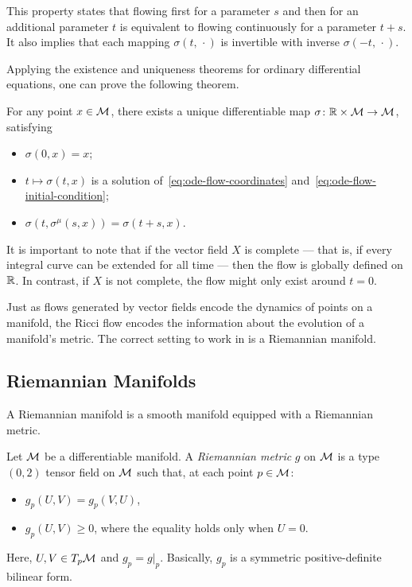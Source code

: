 This property states that flowing first for a parameter $s$ and then for an additional parameter $t$ is equivalent to flowing continuously for a parameter $t + s$. It also implies that each mapping $\sigma(t,\,\cdot)$ is invertible with inverse $\sigma(-t,\,\cdot)$.

Applying the existence and uniqueness theorems for ordinary differential equations, one can prove the following theorem.

\begin{theorem}
	For any point $x \in \mathcal{M}$, there exists a unique differentiable map $\sigma \colon \mathbb{R} \times \mathcal{M} \to \mathcal{M}$, satisfying
	\begin{itemize}
		\item $\sigma(0,x) = x$;
		\item $t \mapsto \sigma(t,x)$ is a solution of~\eqref{eq:ode-flow-coordinates} and~\eqref{eq:ode-flow-initial-condition};
		\item $\sigma(t,\sigma^\mu(s,x)) = \sigma(t+s,x)$.
	\end{itemize}
\end{theorem}

It is important to note that if the vector field $X$ is complete — that is, if every integral curve can be extended for all time — then the flow is globally defined on $\mathbb{R}$. In contrast, if $X$ is not complete, the flow might only exist around $t = 0$.

Just as flows generated by vector fields encode the dynamics of points on a manifold, the Ricci flow encodes the information about the evolution of a manifold's metric. The correct setting to work in is a Riemannian manifold. 


\subsection{Riemannian Manifolds}
A Riemannian manifold is a smooth manifold equipped with a Riemannian metric.

\begin{definition}
	Let $\mathcal{M}$ be a differentiable manifold. A \emph{Riemannian metric} $g$ on $\mathcal{M}$ is a type $(0,2)$ tensor field on $\mathcal{M}$ such that, at each point $p \in \mathcal{M}$:
	\begin{itemize}
		\item $g_p (U,V) = g_p (V,U)$,
		\item $g_p(U,V) \geq 0$, where the equality holds only when $U=0$.
	\end{itemize}
	Here, $U,V \in T_p \mathcal{M}$ and $g_p = g|_p$. Basically, $g_p$ is a symmetric positive-definite bilinear form.
\end{definition}

